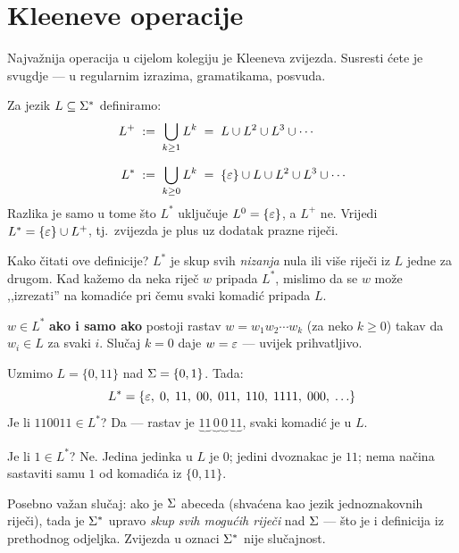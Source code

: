 \section{Kleeneve operacije}

Najvažnija operacija u cijelom kolegiju je Kleeneva zvijezda.
Susresti ćete je svugdje --- u regularnim izrazima, gramatikama, posvuda.

\begin{definicija}
Za jezik $L \subseteq \Sigma^*$ definiramo:
\begin{align*}
  L^+ &\;:=\; \bigcup_{k \geq 1} L^k
        \;=\; L \cup L^2 \cup L^3 \cup \cdots \\[6pt]
  L^* &\;:=\; \bigcup_{k \geq 0} L^k
        \;=\; \{\varepsilon\} \cup L \cup L^2 \cup L^3 \cup \cdots
\end{align*}
Razlika je samo u tome što $L^*$ uključuje $L^0 = \{\varepsilon\}$, a $L^+$ ne.
Vrijedi $L^* = \{\varepsilon\} \cup L^+$, tj.\ zvijezda je plus uz dodatak
prazne riječi.
\end{definicija}

Kako čitati ove definicije? $L^*$ je skup svih \emph{nizanja} nula ili više
riječi iz $L$ jedne za drugom. Kad kažemo da neka riječ $w$ pripada $L^*$,
mislimo da se $w$ može ,,izrezati'' na komadiće pri čemu svaki komadić
pripada $L$.

\begin{kljucno}
$w \in L^*$ \textbf{ako i samo ako} postoji rastav
$w = w_1 w_2 \cdots w_k$ (za neko $k \geq 0$) takav da $w_i \in L$
za svaki $i$. Slučaj $k = 0$ daje $w = \varepsilon$ --- uvijek prihvatljivo.
\end{kljucno}

\begin{primjer}
Uzmimo $L = \{0, 11\}$ nad $\Sigma = \{0, 1\}$. Tada:
\[
  L^* = \{\varepsilon,\; 0,\; 11,\; 00,\; 011,\; 110,\; 1111,\; 000,\; \ldots\}
\]
Je li $110011 \in L^*$? Da --- rastav je
$\underbrace{11}_{}\,\underbrace{0}_{}\,\underbrace{0}_{}\,\underbrace{11}_{}$,
svaki komadić je u $L$.

Je li $1 \in L^*$? Ne. Jedina jedinka u $L$ je $0$; jedini dvoznakac je $11$;
nema načina sastaviti samu $1$ od komadića iz $\{0, 11\}$.
\end{primjer}

\begin{primjer}
Posebno važan slučaj: ako je $\Sigma$ abeceda (shvaćena kao jezik
jednoznakovnih riječi), tada je $\Sigma^*$ upravo \emph{skup svih mogućih
riječi} nad $\Sigma$ --- što je i definicija iz prethodnog odjeljka.
Zvijezda u oznaci $\Sigma^*$ nije slučajnost.
\end{primjer}

